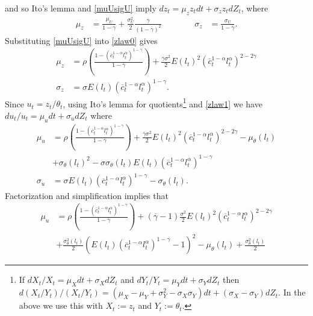 \documentclass[11pt]{article}
\theoremstyle{plain}
\begin{document}
and so Ito's lemma and \eqref{muUsigU} imply $dz_t = \mu_zz_tdt + \sigma_zz_tdZ_t$, where 
\begin{equation}
\begin{aligned}
\mu_z & = \frac{\mu_U}{1-\overline{\gamma}}+ \frac{\sigma_U^2}{2}\frac{\overline{\gamma}}{(1-\overline{\gamma})^2} \ \ \ \ \ \ \ & \ \ \ \ \ \ \ 
\sigma_z & = \frac{\sigma_U}{1-\overline{\gamma}}.
\end{aligned}
\label{zlaw0}
\end{equation}
Substituting \eqref{muUsigU} into \eqref{zlaw0} gives
\begin{equation}
\begin{aligned}
\mu_z & = \rho{\left(\frac{1 - (\overline{c}_t^{1-\alpha}l_t^{\alpha})^{1-\gamma}}{1-\overline{\gamma}}\right)} + \frac{\overline{\gamma}\sigma^2}{2} E(l_t)^2 (\overline{c}_t^{1-\alpha}l_t^{\alpha})^{2-2\gamma}
\\ \sigma_z & =  \sigma E(l_t) (\overline{c}_t^{1-\alpha}l_t^{\alpha})^{1-\gamma}.
\end{aligned}
\label{zlaw1}
\end{equation} %
Since $u_t = z_t/\theta_t$, using Ito's lemma for quotients\footnote{If $dX_t/X_t = \mu_Xdt + \sigma_XdZ_t$ and $dY_t/Y_t = \mu_Ydt + \sigma_YdZ_t$ then $d(X_t/Y_t)/(X_t/Y_t) = (\mu_X - \mu_Y + \sigma_Y^2 - \sigma_X\sigma_Y)dt + (\sigma_X-\sigma_Y)dZ_t$. In the above we use this with $X_t := z_t$ and $Y_t := \theta_t$.} and \eqref{zlaw1} we have $du_t/u_t = \mu_udt + \sigma_u dZ_t$ where
\begin{align*}
\mu_u & = \rho {\left(\frac{1 - (\overline{c}_t^{1-\alpha}l_t^{\alpha})^{1-\gamma}}{1-\overline{\gamma}}\right)} + \frac{\overline{\gamma}\sigma^2}{2} E(l_t)^2(\overline{c}_t^{1-\alpha}l_t^{\alpha})^{2-2\gamma}  - \mu_{\theta}(l_t)
\\ & + \sigma_{\theta}(l_t)^2 - \sigma \sigma_{\theta}(l_t) E(l_t)(\overline{c}_t^{1-\alpha}l_t^{\alpha})^{1-\gamma}
\\ \sigma_u & = \sigma E(l_t)(\overline{c}_t^{1-\alpha}l_t^{\alpha})^{1-\gamma} - \sigma_{\theta}(l_t).
\end{align*}
Factorization and simplification implies that 
\begin{equation}
\begin{aligned}
\mu_u & = \rho {\left(\frac{1 - (\overline{c}_t^{1-\alpha}l_t^{\alpha})^{1-\gamma}}{1-\overline{\gamma}}\right)} + (\overline{\gamma}-1)\frac{\sigma^2}{2} E(l_t)^2(\overline{c}_t^{1-\alpha}l_t^{\alpha})^{2-2\gamma}
\\ & + \frac{\sigma^2_{\theta}(l_t) }{2}(E(l_t)(\overline{c}_t^{1-\alpha}l_t^{\alpha})^{1-\gamma} - 1)^2  - \mu_{\theta}(l_t) + \frac{\sigma^2_{\theta}(l_t) }{2}
\end{aligned}
\label{normlaw}
\end{equation}
\end{document}
